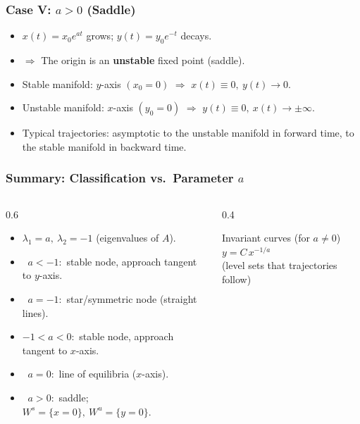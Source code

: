 \documentclass{beamer}
\begin{document}

\begin{frame}
  \frametitle{Case V: $a>0$ (Saddle)}
  \begin{itemize}
    \item \(x(t)=x_0 e^{a t}\) grows; \(y(t)=y_0 e^{-t}\) decays.
    \item \(\Rightarrow\) The origin is an \textbf{unstable} fixed point (saddle).
    \item Stable manifold: \(y\)-axis \((x_0=0)\) $\Rightarrow$ \(x(t)\equiv 0,\ y(t)\to 0\).
    \item Unstable manifold: \(x\)-axis \((y_0=0)\) $\Rightarrow$ \(y(t)\equiv 0,\ x(t)\to \pm\infty\).
    \item Typical trajectories: asymptotic to the unstable manifold in forward time, to the stable manifold in backward time.
  \end{itemize}
\end{frame}


\begin{frame}
  \frametitle{Summary: Classification vs.\ Parameter $a$}
  \vspace{-0.3em}
  \begin{columns}[T]
    \begin{column}{0.6\textwidth}
      \begin{itemize}
        \item \(\lambda_1=a,\ \lambda_2=-1\) (eigenvalues of \(A\)).
        \item \(\;\;a<-1:\) stable node, approach tangent to \(y\)-axis.
        \item \(\;\;a=-1:\) star/symmetric node (straight lines).
        \item \(-1<a<0:\) stable node, approach tangent to \(x\)-axis.
        \item \(\;\;a=0:\) line of equilibria (\(x\)-axis).
        \item \(\;\;a>0:\) saddle; \(W^s=\{x=0\},\ W^u=\{y=0\}\).
      \end{itemize}
    \end{column}
    \begin{column}{0.4\textwidth}
      \begin{block}{Invariant curves (for $a\neq 0$)}
        \(y = C\,x^{-1/a}\) \\
        (level sets that trajectories follow)
      \end{block}
    \end{column}
  \end{columns}
\end{frame}
\end{document}
